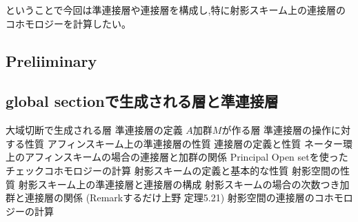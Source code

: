 ということで今回は準連接層や連接層を構成し,特に射影スキーム上の連接層のコホモロジーを計算したい。

\subsection{Preliiminary}

\subsection{global sectionで生成される層と準連接層}

\begin{screen}
\begin{dfn}
  
\end{dfn}
\end{screen}


大域切断で生成される層
準連接層の定義
$A$加群$M$が作る層
準連接層の操作に対する性質
アフィンスキーム上の準連接層の性質
連接層の定義と性質
ネーター環上のアフィンスキームの場合の連接層と加群の関係
Principal Open setを使ったチェックコホモロジーの計算
射影スキームの定義と基本的な性質
射影空間の性質
射影スキーム上の準連接層と連接層の構成
射影スキームの場合の次数つき加群と連接層の関係
(Remarkするだけ上野 定理5.21)
射影空間の連接層のコホモロジーの計算



